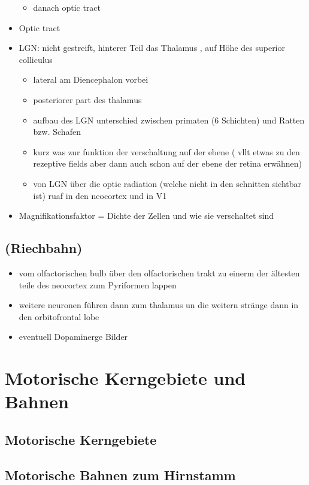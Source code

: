 \documentclass[12pt,a4paper,pdftex]{article}
\begin{document}
\begin{itemize}
\begin{itemize}
        \item danach optic tract
    \end{itemize}
    \item Optic tract 
    \item LGN: nicht gestreift, hinterer Teil das Thalamus , auf Höhe des superior colliculus 
    \begin{itemize}
        \item lateral am Diencephalon  vorbei
        \item posteriorer part des thalamus
        \item aufbau des LGN unterschied zwischen primaten (6 Schichten) und Ratten bzw. Schafen
        \item kurz was zur funktion der verschaltung auf der ebene ( vllt etwas zu den rezeptive fields aber dann auch schon auf der ebene der retina erwähnen)
        \item von LGN über die optic radiation (welche nicht in den schnitten sichtbar ist) ruaf in den neocortex und in V1 
    \end{itemize}
    \item Magnifikationsfaktor = Dichte der Zellen und wie sie verschaltet sind
    \\
\end{itemize}
\subsection{(Riechbahn)}
\begin{itemize}
    \item vom olfactorischen bulb über den olfactorischen trakt zu einerm der ältesten teile des neocortex zum Pyriformen lappen
    \item weitere neuronen führen dann zum thalamus un die weitern stränge dann in den orbitofrontal lobe \cite{smith2008biology} 
    \item eventuell Dopaminerge Bilder
\end{itemize}

\newpage
\section{Motorische Kerngebiete und Bahnen}
\subsection{Motorische Kerngebiete}
\subsection{Motorische Bahnen zum Hirnstamm}
\end{document}
